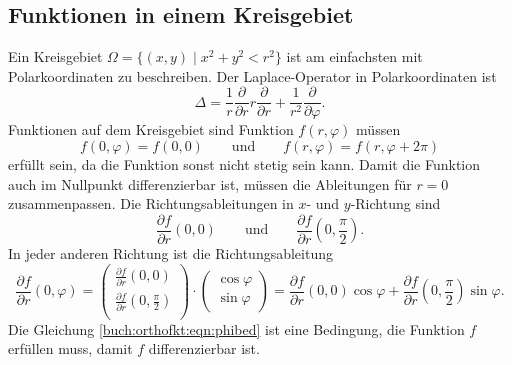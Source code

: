 %
%
\subsection{Funktionen in einem Kreisgebiet}
Ein Kreisgebiet $\Omega = \{(x,y)\mid x^2+y^2< r^2\}$ ist am einfachsten
mit Polarkoordinaten zu beschreiben.
Der Laplace-Operator in Polarkoordinaten ist
\[
\Delta 
=
\frac1r \frac{\partial}{\partial r} r \frac{\partial}{\partial r}
+
\frac{1}{r^2} \frac{\partial}{\partial\varphi}.
\]
Funktionen auf dem Kreisgebiet sind Funktion $f(r,\varphi)$ müssen
\[
f(0,\varphi) = f(0,0)
\qquad\text{und}\qquad
f(r,\varphi) = f(r,\varphi+2\pi)
\]
erfüllt sein, da die Funktion sonst nicht stetig sein kann.
Damit die Funktion auch im Nullpunkt differenzierbar ist, müssen die
Ableitungen für $r=0$ zusammenpassen.
Die Richtungsableitungen in $x$- und $y$-Richtung sind
\[
\frac{\partial f}{\partial r}(0,0)
\qquad\text{und}\qquad
\frac{\partial f}{\partial r}(0,{\textstyle\frac{\pi}2}).
\]
In jeder anderen Richtung ist die Richtungsableitung
\begin{equation}
\frac{\partial f}{\partial r}(0,\varphi)
=
\begin{pmatrix}
\frac{\partial f}{\partial r}(0,0)\\
\frac{\partial f}{\partial r}(0,{\textstyle\frac{\pi}2})\\
\end{pmatrix}
\cdot
\begin{pmatrix}
\cos\varphi\\
\sin\varphi
\end{pmatrix}
=
\frac{\partial f}{\partial r}(0,0)\cos\varphi
+
\frac{\partial f}{\partial r}(0,{\textstyle\frac{\pi}2})\sin\varphi.
\label{buch:orthofkt:eqn:phibed}
\end{equation}
Die Gleichung
\eqref{buch:orthofkt:eqn:phibed}
ist eine Bedingung, die Funktion $f$ erfüllen muss, damit $f$
differenzierbar ist.

%
%
